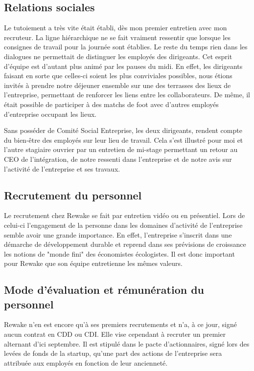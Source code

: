 \documentclass{rapportENSCP}
\begin{document}
\subsection{Relations sociales}
Le tutoiement a très vite était établi, dès mon premier entretien avec mon recruteur. La ligne hiérarchique ne se fait vraiment ressentir que lorsque les consignes de travail pour la journée sont établies. Le reste du temps rien dans les dialogues ne permettait de distinguer les employés des dirigeants. Cet esprit d'équipe est d'autant plus animé par les pauses du midi. En effet, les dirigeants faisant en sorte que celles-ci soient les plus conviviales possibles, nous étions invités à prendre notre déjeuner ensemble sur une des terrasses des lieux de l'entreprise, permettant de renforcer les liens entre les collaborateurs. De même, il était possible de participer à des matchs de foot avec d'autres employés d'entreprise occupant les lieux.

Sans posséder de Comité Social Entreprise, les deux dirigeants, rendent compte du bien-être des employés sur leur lieu de travail. Cela s'est illustré pour moi et l'autre stagiaire ouvrier par un entretien de mi-stage permettant un retour au CEO de l'intégration, de notre ressenti dans l'entreprise et de notre avis sur l'activité de l'entreprise et ses travaux.

\subsection{Recrutement du personnel}
Le recrutement chez Rewake se fait par entretien vidéo ou en présentiel. Lors de celui-ci l'engagement de la personne dans les domaines d'activité de l'entreprise semble avoir une grande importance. En effet, l'entreprise s'inscrit dans une démarche de développement durable et reprend dans ses prévisions de croissance les notions de "monde fini" des économistes écologistes. Il est donc important pour Rewake que son équipe entretienne les mêmes valeurs.

\subsection{Mode d'évaluation et rémunération du personnel}
Rewake n'en est encore qu'à ses premiers recrutements et n'a, à ce jour, signé aucun contrat en CDD ou CDI. Elle vise cependant à recruter un premier alternant d'ici septembre. Il est stipulé dans le pacte d'actionnaires, signé lors des levées de fonds de la startup, qu'une part des actions de l'entreprise sera attribuée aux employés en fonction de leur ancienneté.
\end{document}
